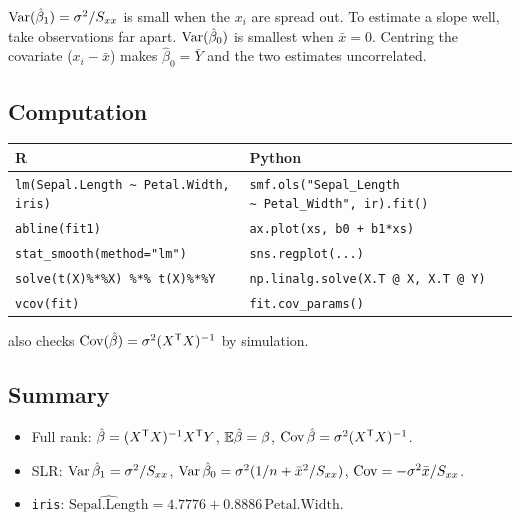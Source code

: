 \begin{note}
$\operatorname{Var}(\hat\beta_1)=\sigma^2/S_{xx}$ is small when the $x_i$ are spread out. To estimate a slope well, take
observations far apart. $\operatorname{Var}(\hat\beta_0)$ is smallest when $\bar x=0$. Centring the covariate ($x_i-\bar x$)
makes $\hat\beta_0=\bar Y$ and the two estimates uncorrelated.
\end{note}

\subsection{Computation}
\begin{center}\small
\begin{tabular}{@{}>{\raggedright\arraybackslash}p{7cm}>{\raggedright\arraybackslash}p{8.4cm}@{}}\hline
R & Python\\\hline
\texttt{lm(Sepal.Length \textasciitilde\ Petal.Width, iris)} & \texttt{smf.ols("Sepal\_Length \textasciitilde\ Petal\_Width", ir).fit()}\\
\texttt{abline(fit1)} & \texttt{ax.plot(xs, b0 + b1*xs)}\\
\texttt{stat\_smooth(method="lm")} & \texttt{sns.regplot(...)}\\
\texttt{solve(t(X)\%*\%X) \%*\% t(X)\%*\%Y} & \texttt{np.linalg.solve(X.T @ X, X.T @ Y)}\\
\texttt{vcov(fit)} & \texttt{fit.cov\_params()}\\\hline
\end{tabular}
\end{center}
 also checks $\operatorname{Cov}(\hat\beta)=\sigma^2(X^{\mathsf T} X)^{-1}$ by simulation.

\subsection{Summary}
\begin{itemize}
  \item Full rank: $\hat\beta=(X^{\mathsf T} X)^{-1}X^{\mathsf T} Y$, $\mathbb E\hat\beta=\beta$, $\operatorname{Cov}\hat\beta=\sigma^2(X^{\mathsf T} X)^{-1}$.
  \item SLR: $\operatorname{Var}\hat\beta_1=\sigma^2/S_{xx}$, $\operatorname{Var}\hat\beta_0=\sigma^2(1/n+\bar x^2/S_{xx})$, $\operatorname{Cov}=-\sigma^2\bar x/S_{xx}$.
  \item \texttt{iris}: $\widehat{\text{Sepal.Length}}=4.7776+0.8886\,\text{Petal.Width}$.
\end{itemize}


